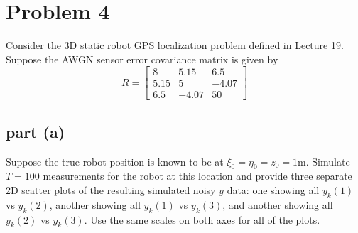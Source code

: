 \documentclass[11pt]{article}
\begin{document}
\section*{Problem 4}
Consider the 3D static robot GPS localization problem defined in Lecture 19. Suppose the AWGN sensor error covariance matrix is given by 
\begin{equation*}
	R=\begin{bmatrix} 8 & 5.15 & 6.5 \\ 5.15 & 5 & -4.07 \\ 6.5 & -4.07 & 50 \end{bmatrix}
\end{equation*}

\subsection*{part (a)}
Suppose the true robot position is known to be at $\xi_0=\eta_0=z_0=1\text{m}$. Simulate $T=100$ measurements for the robot at this location and provide three separate 2D scatter plots of the resulting simulated noisy $y$ data: one showing all $y_k(1)$ vs $y_k(2)$, another showing all $y_k(1)$ vs $y_k(3)$, and another showing all $y_k(2)$ vs $y_k(3)$. Use the same scales on both axes for all of the plots.
\end{document}
